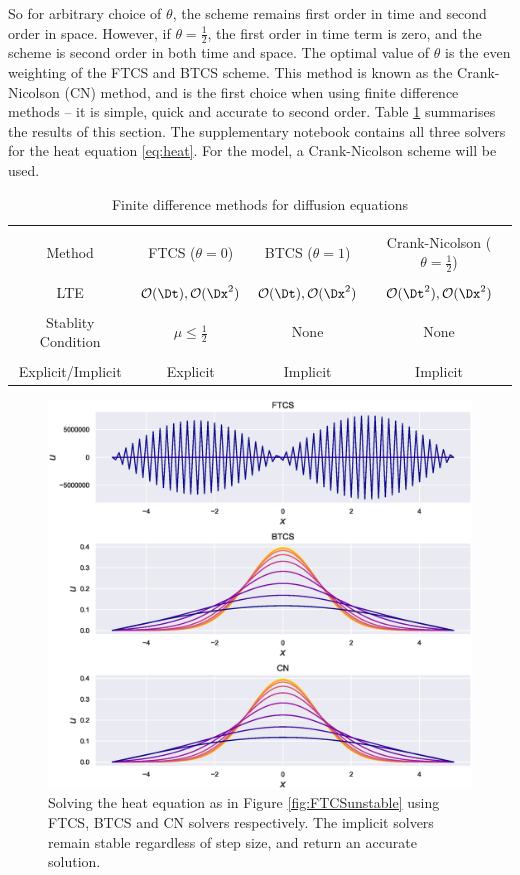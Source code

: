 So for arbitrary choice of $\theta$, the scheme remains first order in time and second order in space. However, if $\theta=\frac{1}{2}$, the first order in time term is zero, and the scheme is second order in both time and space. The optimal value of $\theta$ is the even weighting of the FTCS and BTCS scheme. This method is known as the Crank-Nicolson (CN) method, and is the first choice when using finite difference methods -- it is simple, quick and accurate to second order. Table \ref{tab:FDmethods} summarises the results of this section. The supplementary notebook contains all three solvers for the heat equation \eqref{eq:heat}. For the model, a Crank-Nicolson scheme will be used.
\begin{table}
    \centering
    \begin{tabular}{|c|c|c|c|}
        \hline
        & & & \\[-0.5em] 
        Method & FTCS ($\theta=0$) & BTCS ($\theta=1$) & Crank-Nicolson ($\theta=\frac{1}{2}$) \\[0.3em] 
        \hline 
        & & & \\[-0.5em] 
        LTE & $\mathcal{O}(\Dt), \mathcal{O}(\Dx^2)$ & $\mathcal{O}(\Dt), \mathcal{O}(\Dx^2)$ & $\mathcal{O}(\Dt^2), \mathcal{O}(\Dx^2)$ \\[0.3em]  
        \hline
        & & & \\[-0.5em]  
        Stablity Condition & $\mu\leq \frac{1}{2}$ & None & None \\[0.3em]  
        \hline 
        & & & \\[-0.5em] 
        Explicit/Implicit & Explicit & Implicit & Implicit \\[0.3em]  
        \hline 
    \end{tabular}
\caption{Finite difference methods for diffusion equations}
\label{tab:FDmethods}
\end{table}

\begin{figure}
    \centering
    \includegraphics[width=0.7\linewidth]{Figures/FTCSandCN}
    \caption[Comparison of FTCS, BTCS, CN solvers]{Solving the heat equation as in Figure \ref{fig:FTCSunstable} using FTCS, BTCS and CN solvers respectively. The implicit solvers remain stable regardless of step size, and return an accurate solution.}
    \label{fig:ftcsandcn}
\end{figure}
